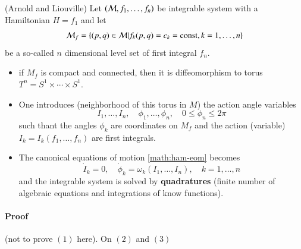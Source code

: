 \begin{theorem} (Arnold and Liouville)
	Let $(\mathcal{M}, f_1, \dots, f_n)$ be integrable system with a Hamiltonian $H=f_1$ and let	
	\begin{equation*}
		\mathcal{M}_f = \left\{ (p, q) \in \mathcal{M} | f_k (p, q) = c_k = \text{const}, k=1, \dots, n \right\} 	
	\end{equation*}
	be a so-called $n$ dimensional level set of first integral $f_n$.
	\begin{itemize}
		\item if $M_f$ is compact and connected, then it is diffeomorphism to torus $T^n = S^1 \times \cdots \times S^1$.
		\item One introduces (neighborhood of this torus in $M$) the action angle variables 
			\begin{equation*}
				I_1, \dots, I_n, \quad \phi_1, \dots, \phi_n, \quad 0 \leq \phi_n \leq 2\pi	
			\end{equation*}
			such thant the angles $\phi_k$ are coordinates on $M_f$ and the action (variable) $I_k=I_k(f_1, \dots, f_n)$ are first integrals.
		\item The canonical equations of motion \eqref{math:ham-eom} becomes
			\begin{equation}
				\dot{I}_k = 0, \quad \dot{\phi}_k = \omega_k (I_1, \dots, I_n), \quad k =1, \dots,n 
				\label{math:action-angle-eom}
			\end{equation}
			and the integrable system is solved by \textbf{quadratures} (finite number of algebraic equations and integrations of know functions).
	\end{itemize}
\end{theorem}

\paragraph{Proof} (not to prove $(1)$ here). On $(2)$ and $(3)$

